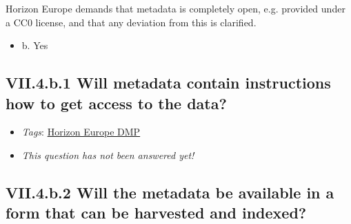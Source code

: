 \documentclass[a4paper,12pt]{report}
\begin{document}
\noindent
\begin{markdown}
Horizon Europe demands that metadata is completely open, e.g. provided under a CC0 license, and that any deviation from this is clarified.
\end{markdown}



\begin{itemize}
  \item[\CheckmarkBold] b. Yes
\end{itemize}




\subsection*{\protect\textcolor{colorSecId}{VII.4.b.1} Will metadata contain instructions how to get access to the data?}

\label{6be88f7c-f868-460f-bba7-91e1c659adfd.12baa8af-db59-43a5-8ec7-0941c58ff89a.cb148cc8-f15f-494f-a197-f01e3111ec60.26b2afa6-99e8-4337-b380-5642bc807ad8}


\begin{itemize}
  \item \textit{Tags}: \ul{Horizon Europe DMP}
  \end{itemize}




\begin{itemize}
  \item[\XSolidBrush] \textit{This question has not been answered yet!}
\end{itemize}
  
\subsection*{\protect\textcolor{colorSecId}{VII.4.b.2} Will the metadata be available in a form that can be harvested and indexed?}

\label{6be88f7c-f868-460f-bba7-91e1c659adfd.12baa8af-db59-43a5-8ec7-0941c58ff89a.cb148cc8-f15f-494f-a197-f01e3111ec60.1270ea5a-92a2-46ce-b658-9bf2862b9b57}
\end{document}
